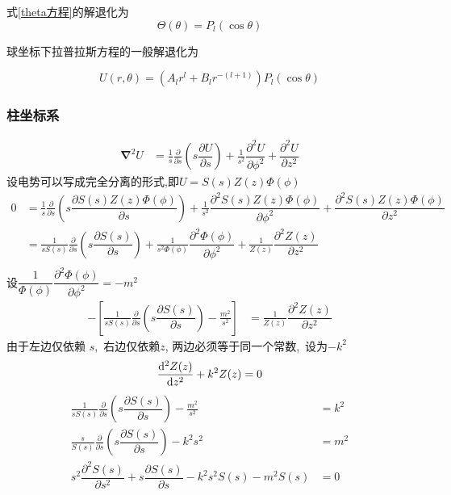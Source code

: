 式\ref{theta方程}的解退化为
\begin{equation}
    \Theta(\theta)=P_l(\cos\theta)
\end{equation}

球坐标下拉普拉斯方程的一般解退化为

\begin{equation}
U(r,\theta)
=
\left(
A_l r^l
+
B_l r^{-(l+1)}
\right)
P_{l}(\cos\theta)
\end{equation}
\subsubsection{柱坐标系}
\begin{align*}
    \boldsymbol{\nabla}^2 U&=\frac{1}{s}\frac{\partial}{\partial s}\left(s\dfrac{{\partial U}}{\partial s}\right)
    +\frac{1}{s^2}\dfrac{{\partial^2 U}}{\partial \phi^2}
    +\dfrac{{\partial^2 U}}{\partial z^2}
\end{align*}
设电势可以写成完全分离的形式,即$U=S(s)Z(z)\Phi(\phi)$
\begin{align*}
    0&=\frac{1}{s}\frac{\partial}{\partial s}\left(s\dfrac{{\partial S(s)Z(z)\Phi(\phi)}}{\partial s}\right)
    +\frac{1}{s^2}\dfrac{{\partial^2 S(s)Z(z)\Phi(\phi)}}{\partial \phi^2}
    +\dfrac{{\partial^2 S(s)Z(z)\Phi(\phi)}}{\partial z^2}\\
    &=\frac{1}{sS(s)}\frac{\partial}{\partial s}\left(s\dfrac{{\partial S(s)}}{\partial s}\right)
    +\frac{1}{s^2\Phi(\phi)}\dfrac{{\partial^2 \Phi(\phi)}}{\partial \phi^2}
    +\frac{1}{Z(z)}\dfrac{{\partial^2 Z(z)}}{\partial z^2}\\
\end{align*}
设$\dfrac{1}{\Phi(\phi)}\dfrac{{\partial^2 \Phi(\phi)}}{\partial \phi^2}=-m^2$
\begin{align*}
    -\left[\frac{1}{sS(s)}\frac{\partial}{\partial s}\left(s\dfrac{{\partial S(s)}}{\partial s}\right)
    -\frac{m^2}{s^2}\right]
    &=\frac{1}{Z(z)}\dfrac{{\partial^2 Z(z)}}{\partial z^2}
\end{align*}
由于左边仅依赖 $s$, \,右边仅依赖$z$,
两边必须等于同一个常数, \,设为$-k^2$
\begin{align*}
\frac{\dif^2 Z(z)}{\dif z^2}+k^2 Z(z)=0
\end{align*}
\begin{align*}
\frac{1}{sS(s)}\frac{\partial}{\partial s}\left(s\dfrac{{\partial S(s)}}{\partial s}\right)
    -\frac{m^2}{s^2}&=k^2\\
    \frac{s}{S(s)}\frac{\partial}{\partial s}\left(s\dfrac{{\partial S(s)}}{\partial s}\right)
    -k^2s^2&=m^2\\
    s^2\dfrac{{\partial^2 S(s)}}{\partial s^2}
    +s\dfrac{{\partial S(s)}}{\partial s}
    -k^2s^2S(s)-m^2S(s)&=0\\
\end{align*}
